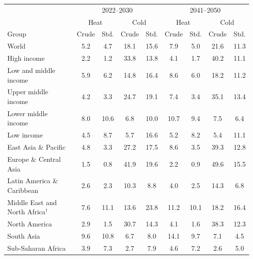 \begin{tabular}{lcccccccc}
\toprule
& \multicolumn{4}{c}{2022--2030} & \multicolumn{4}{c}{2041--2050} \\ & \multicolumn{2}{c}{Heat} & \multicolumn{2}{c}{Cold} & \multicolumn{2}{c}{Heat} & \multicolumn{2}{c}{Cold} \\ Group & Crude & Std. & Crude & Std. & Crude & Std. & Crude & Std. \\
\midrule
World & 5.2 & 4.7 & 18.1 & 15.6 & 7.9 & 5.0 & 21.6 & 11.3 \\ \addlinespace
High income & 2.2 & 1.2 & 33.8 & 13.8 & 4.1 & 1.7 & 40.2 & 11.1 \\
Low and middle income & 5.9 & 6.2 & 14.8 & 16.4 & 8.6 & 6.0 & 18.2 & 11.2 \\
Upper middle income & 4.2 & 3.3 & 24.7 & 19.1 & 7.4 & 3.4 & 35.1 & 13.4 \\
Lower middle income & 8.0 & 10.6 & 6.8 & 10.0 & 10.7 & 9.4 & 7.5 & 6.4 \\
Low income & 4.5 & 8.7 & 5.7 & 16.6 & 5.2 & 8.2 & 5.4 & 11.1 \\ \addlinespace
East Asia \& Pacific & 4.8 & 3.3 & 27.2 & 17.5 & 8.6 & 3.5 & 39.3 & 12.8 \\
Europe \& Central Asia & 1.5 & 0.8 & 41.9 & 19.6 & 2.2 & 0.9 & 49.6 & 15.5 \\
Latin America \& Caribbean & 2.6 & 2.3 & 10.3 & 8.8 & 4.0 & 2.5 & 14.3 & 6.8 \\
Middle East and North Africa$^{\dagger}$ & 7.6 & 11.1 & 13.6 & 23.8 & 11.2 & 10.1 & 18.2 & 16.4 \\
North America & 2.9 & 1.5 & 30.7 & 14.3 & 4.1 & 1.6 & 38.3 & 12.3 \\
South Asia & 9.6 & 10.8 & 6.7 & 8.0 & 14.1 & 9.7 & 7.1 & 4.5 \\
Sub-Saharan Africa & 3.9 & 7.3 & 2.7 & 7.9 & 4.6 & 7.2 & 2.6 & 5.0 \\
\bottomrule
\end{tabular}
